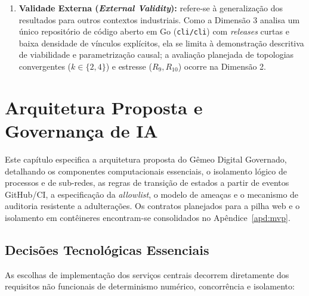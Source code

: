 \documentclass[12pt,openany,oneside,a4paper,english,brazilian,sumario=tradicional]{abntex2}
\begin{document}
\begin{enumerate}
  \item \textbf{Validade Externa (\textit{External Validity}):} refere-se à generalização dos resultados para outros contextos industriais. Como a Dimensão 3 analisa um único repositório de código aberto em Go (\texttt{cli/\allowbreak cli}) com \textit{releases} curtas e baixa densidade de vínculos explícitos, ela se limita à demonstração descritiva de viabilidade e parametrização causal; a avaliação planejada de topologias convergentes ($k \in \{2,4\}$) e estresse ($R_9, R_{10}$) ocorre na Dimensão 2.
\end{enumerate}

\chapter{Arquitetura Proposta e Governança de IA}\label{cap:arquitetura}

Este capítulo especifica a arquitetura proposta do Gêmeo Digital Governado, detalhando os componentes computacionais essenciais, o isolamento lógico de processos e de sub-redes, as regras de transição de estados a partir de eventos GitHub/CI, a especificação da \textit{allowlist}, o modelo de ameaças e o mecanismo de auditoria resistente a adulterações. Os contratos planejados para a pilha web e o isolamento em contêineres encontram-se consolidados no Apêndice~\ref{apd:mvp}.

\section{Decisões Tecnológicas Essenciais}

As escolhas de implementação dos serviços centrais decorrem diretamente dos requisitos não funcionais de determinismo numérico, concorrência e isolamento:
\end{document}
